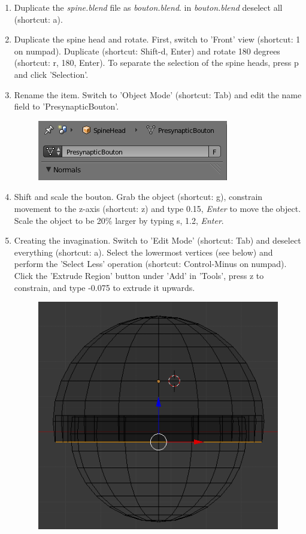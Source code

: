 \documentclass[twoside,a4paper]{refart}
\begin{document}
\begin{enumerate}
    \item   Duplicate the \textit{spine.blend} file as \textit{bouton.blend}. in \textit{bouton.blend} deselect all (shortcut: a).
    
\item   Duplicate the spine head and rotate. First, switch to 'Front' view (shortcut: 1 on numpad). Duplicate (shortcut: Shift-d, Enter) and rotate 180 degrees (shortcut: r, 180, Enter). To separate the selection of the spine heads, press p and click 'Selection'.

\item   Rename the item. Switch to 'Object Mode' (shortcut: Tab) and edit the name field to 'PresynapticBouton'.
        \begin{figure}[H]
        \includegraphics[scale=0.5]{bouton1.png}
        \end{figure}

\item   Shift and scale the bouton. Grab the object (shortcut: g), constrain movement to the z-axis (shortcut: z) and type 0.15, \textit{Enter} to move the object. Scale the object to be 20\% larger by typing s, 1.2, \textit{Enter}.

\item   Creating the invagination. Switch to 'Edit Mode' (shortcut: Tab) and deselect everything (shortcut: a). Select the lowermost vertices (see below) and perform the 'Select Less' operation (shortcut: Control-Minus on numpad). Click the 'Extrude Region' button under 'Add' in 'Tools', press z to constrain, and type -0.075 to extrude it upwards.
        \begin{figure}[H]
        \includegraphics[scale=0.5]{bouton2.png}
        \end{figure}

\end{enumerate}
\end{document}
